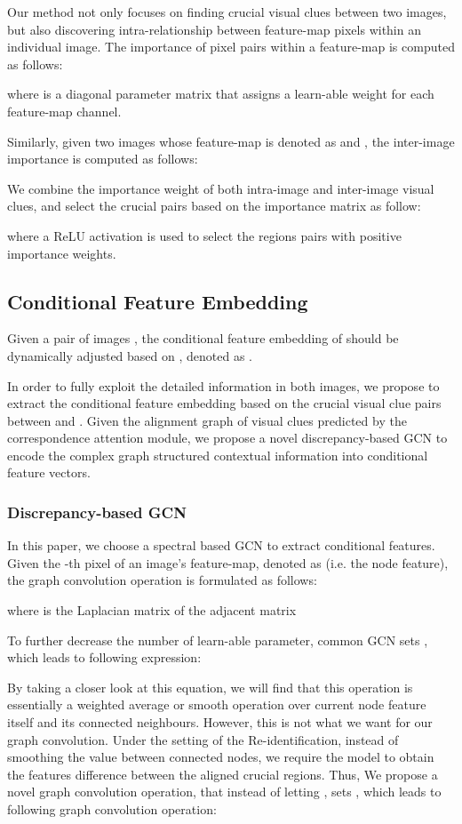 \documentclass[final]{cvpr}
\begin{document}
Our method not only focuses on finding crucial visual clues between two images, but also discovering intra-relationship between feature-map pixels within an individual image. 
The importance of pixel pairs within a feature-map   is computed as follows:

where  is a diagonal parameter matrix that assigns a learn-able weight for each feature-map channel. 

Similarly, given two images whose feature-map is denoted as  and , the inter-image importance is computed as follows:



We combine the importance weight of both intra-image and inter-image visual clues, and select the crucial pairs based on the importance matrix as follow: 

where a ReLU activation is used to select the regions pairs with positive importance weights. 

\subsection{Conditional Feature Embedding}

Given a pair of images , the conditional feature embedding of  should be dynamically adjusted based on , denoted as . 

In order to fully exploit the detailed information in both images, we propose to extract the conditional feature embedding based on the crucial visual clue pairs between  and .  
Given the alignment graph  of visual clues predicted by the correspondence attention module, 
we propose a novel discrepancy-based GCN to encode the complex graph structured contextual information into conditional feature vectors. 

\subsubsection{Discrepancy-based GCN}
In this paper, we choose a spectral based GCN \cite{kipf2016semi} to extract conditional features. 
Given the -th pixel of an image's feature-map, denoted as  (i.e. the node feature), the graph convolution operation is formulated as follows: 

where  is the Laplacian matrix of the adjacent matrix 

To further decrease the number of learn-able parameter, common GCN sets , which leads to following expression:

By taking a closer look at this equation, we will find that this operation is essentially a weighted average or smooth operation over current node feature itself and its connected neighbours. However, this is not what we want for our graph convolution. Under the setting of the Re-identification, instead of smoothing the value between connected nodes, we require the model to obtain the features difference between the aligned crucial regions. Thus, We propose a novel graph convolution operation, that instead of letting , sets , which leads to following graph convolution operation:
\end{document}
